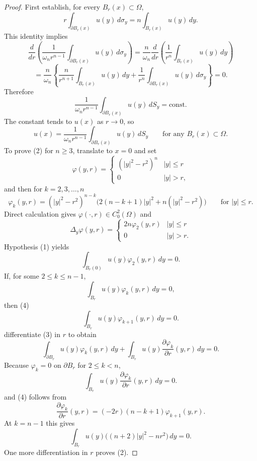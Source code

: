 \begin{proof}
\sketch First establish, for every $B_r(x)\subset\Omega$,
\begin{equation}
r\int_{\partial B_r(x)} u(y)\,d\sigma_y = n\int_{B_r(x)} u(y)\,dy.
\tag{2}
\end{equation}
This identity implies
\[
\frac{d}{dr}\left(\frac{1}{\omega_n r^{n-1}}\int_{\partial B_r(x)} u(y)\,d\sigma_y\right)
= \frac{n}{\omega_n}\frac{d}{dr}\left(\frac{1}{r^n}\int_{B_r(x)} u(y)\,dy\right)
\]
\[
= \frac{n}{\omega_n}\left\{\frac{n}{r^{n+1}}\int_{B_r(x)} u(y)\,dy + \frac{1}{r^n}\int_{\partial B_r(x)} u(y)\,d\sigma_y\right\}=0.
\]
Therefore
\[
\frac{1}{\omega_n r^{n-1}}\int_{\partial B_r(x)} u(y)\,dS_y = \text{const.}
\]
The constant tends to $u(x)$ as $r\to0$, so
\[
u(x)=\frac{1}{\omega_n r^{n-1}}\int_{\partial B_r(x)} u(y)\,dS_y
\qquad \text{for any $B_r(x)\subset\Omega$.}
\]
To prove (2) for $n\ge3$, translate to $x=0$ and set
\[
\varphi(y,r)=
\begin{cases}
(|y|^2-r^2)^n & |y|\le r\\
0 & |y|>r,
\end{cases}
\]
and then for $k=2,3,\ldots,n$
\[
\varphi_k(y,r)=(|y|^2-r^2)^{n-k}\bigl(2(n-k+1)|y|^2+n(|y|^2-r^2)\bigr)
\qquad \text{for $|y|\le r$.}
\]
Direct calculation gives $\varphi(\cdot,r)\in C_0^2(\Omega)$ and
\[
\Delta_y\varphi(y,r)=
\begin{cases}
2n\varphi_2(y,r) & |y|\le r\\
0 & |y|>r.
\end{cases}
\]
Hypothesis (1) yields
\[
\int_{B_r(0)} u(y)\varphi_2(y,r)\,dy = 0.
\]
If, for some $2\le k\le n-1$,
\begin{equation}
\int_{B_r} u(y)\varphi_k(y,r)\,dy = 0,
\tag{3}
\end{equation}
then
(4)
\begin{equation*}
\int_{B_r} u(y)\varphi_{k+1}(y,r)\,dy = 0.
\end{equation*}
differentiate (3) in $r$ to obtain
\begin{equation*}
\int_{\partial B_r} u(y)\varphi_k(y,r)\,dy + \int_{B_r} u(y)\frac{\partial \varphi_k}{\partial r}(y,r)\,dy = 0.
\end{equation*}
Because $\varphi_k=0$ on $\partial B_r$ for $2\le k<n$,
\begin{equation*}
\int_{B_r} u(y)\frac{\partial \varphi_k}{\partial r}(y,r)\,dy = 0.
\end{equation*}
and (4) follows from
\begin{equation*}
\frac{\partial \varphi_k}{\partial r}(y,r) = (-2r)(n-k+1)\varphi_{k+1}(y,r).
\end{equation*}
At $k=n-1$ this gives
\begin{equation*}
\int_{B_r} u(y)\bigl((n+2)|y|^2 - nr^2\bigr)\,dy = 0.
\end{equation*}
One more differentiation in $r$ proves (2).
\end{proof}

